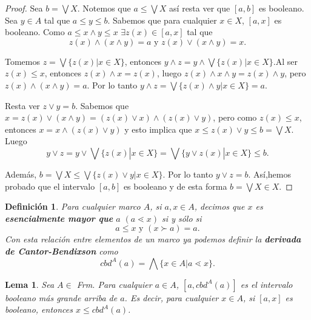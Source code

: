 \documentclass[12pt,letterpaper,titlepage]{article}
\newtheorem*{defn}{Definición}
\newtheorem{lemma}{Lema}
\theoremstyle{definition}
\newcommand\<{\langle}
\renewcommand\>{\rangle}
\begin{document}
\begin{proof}
Sea $b=\bigvee X$. Notemos que $a\leq\bigvee X$ así resta ver que $[a, b]$ es booleano.\\
\noindent
Sea $y\in A$ tal que $a\leq y\leq b$. Sabemos que para cualquier $x\in X$, $[a, x]$ es booleano. Como $a\leq x\wedge y\leq x$ $\exists z(x)\in [a,x]$ tal que 
$$z(x)\wedge (x\wedge y)=a\mbox{  y  }z(x)\vee (x\wedge y)=x.$$

\noindent
Tomemos $z=\bigvee\{z(x)|x\in X\}$, entonces $y\wedge z=y\wedge\bigvee\{z(x)|x\in X\}$.Al ser $z(x)\leq x$, entonces $z(x)\wedge x=z(x)$, luego $z(x)\wedge x\wedge y=z(x)\wedge y$, pero  $z(x)\wedge(x\wedge y)=a$. Por lo tanto $y\wedge z=\bigvee\{z(x)\wedge y|x\in X\}=a$.

\noindent
Resta ver $z\vee y=b$. Sabemos que $x=z(x)\vee (x\wedge y)=(z(x)\vee x)\wedge (z(x)\vee y)$, pero como $z(x)\leq x$, entonces $x=x\wedge (z(x)\vee y)$ y esto implica que $x\leq z(x)\vee y\leq b=\bigvee X.$ Luego $$y\vee z=y\vee\bigvee\{z(x)|x\in X\}=\bigvee\{y\vee z(x)|x\in X\}\leq b.$$

\noindent
Además, $b=\bigvee X\leq \bigvee\{z(x)\vee y|x\in X\}$. Por lo tanto $y\vee z=b.$ Así,hemos probado que el intervalo $[a,b]$ es booleano y de esta forma $b=\bigvee X\in X$.
\end{proof}

\begin{defn}
Para cualquier marco $A$, si $a,x\in A$, decimos que $x$  es \textbf{esencialmente mayor que} $a$ $(a\lessdot x)$ si y sólo si $$a\leq x\mbox{  y  }(x\succ a)=a.$$
Con esta relación entre elementos de un marco ya podemos definir la \textbf{derivada de Cantor-Bendixson} como $$cbd^A(a)=\bigwedge\{x\in A|a\lessdot x\}.$$
\end{defn}

\begin{lemma}\label{Lema46}
Sea $A\in$ \textit{Frm}. Para cualquier $a\in A$, $[a,cbd^A(a)]$ es el intervalo booleano más grande arriba de $a$. Es decir, para cualquier $x\in A$, si $[a,x]$ es booleano, entonces $x\leq cbd^A(a)$.
\end{lemma}
\end{document}
